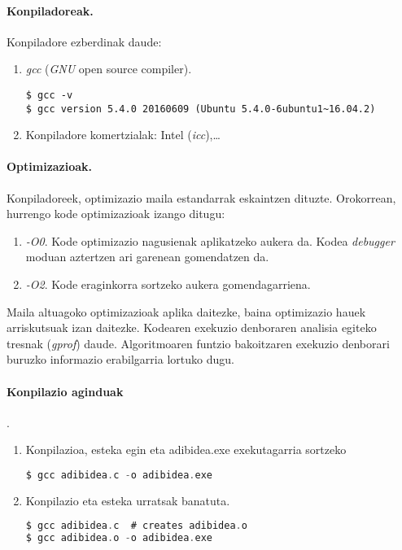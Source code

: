 \paragraph{Konpiladoreak.} Konpiladore ezberdinak daude:
\begin{enumerate}
\item \emph{gcc} (\emph{GNU} open source compiler).
\begin{lstlisting}
$ gcc -v
$ gcc version 5.4.0 20160609 (Ubuntu 5.4.0-6ubuntu1~16.04.2) 
\end{lstlisting}

\item Konpiladore komertzialak: Intel (\emph{icc}),\dots

\end{enumerate}

\paragraph{Optimizazioak.} Konpiladoreek, optimizazio maila estandarrak eskaintzen dituzte. Orokorrean, hurrengo kode optimizazioak izango ditugu:
\begin{enumerate}
\item \emph{-O0}.
Kode optimizazio nagusienak aplikatzeko aukera da. Kodea \emph{debugger} moduan aztertzen ari garenean gomendatzen da.
\item \emph{-O2}.
Kode eraginkorra sortzeko aukera gomendagarriena. 
\end{enumerate}  

Maila altuagoko optimizazioak aplika daitezke, baina optimizazio hauek arriskutsuak izan daitezke. Kodearen exekuzio denboraren analisia egiteko tresnak (\emph{gprof}) daude. Algoritmoaren funtzio bakoitzaren exekuzio denborari buruzko informazio erabilgarria lortuko dugu.   

\paragraph{Konpilazio aginduak}.
\begin{enumerate}
\item Konpilazioa, esteka egin eta adibidea.exe exekutagarria sortzeko
\begin{lstlisting}[language=C]
$ gcc adibidea.c -o adibidea.exe
\end{lstlisting}

\item Konpilazio eta esteka urratsak banatuta.
\begin{lstlisting}[language=C]
$ gcc adibidea.c  # creates adibidea.o
$ gcc adibidea.o -o adibidea.exe
\end{lstlisting}

\end{enumerate}

